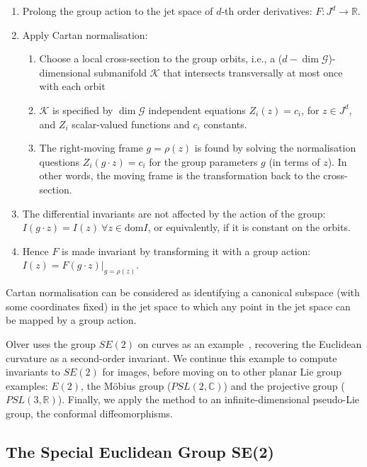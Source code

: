 \documentclass[review,onefignum,onetabnum]{siamonline190516}
\begin{document}
\begin{enumerate}
\item Prolong the group action to the jet space of $d$-th order derivatives: $F: J^d \to \mathbb{R}$. 
\item Apply Cartan normalisation:
    \begin{enumerate}
    \item Choose a local cross-section to the group orbits, i.e., a ($d - \dim \mathcal{G}$)-dimensional submanifold $\mathcal{K}$ that intersects transversally at most once with each orbit
    \item $\mathcal{K}$ is specified by $\dim \mathcal{G}$ independent equations $Z_i (z) = c_i$, for $z \in J^d$,  and $Z_i$ scalar-valued functions and $c_i$ constants.
    \item The right-moving frame $g = \rho(z)$ is found by solving the normalisation questions $Z_i (g \cdot z) = c_i$ for the group parameters $g$ (in terms of $z$). In other words, the moving frame is the transformation back to the cross-section.
    \end{enumerate}
\item The differential invariants are not affected by the action of the group: $I(g \cdot z) = I(z) \: \forall z \in \mathrm{dom} I$, or equivalently, if it is constant on the orbits. 
\item Hence $F$ is made invariant by transforming it with a group action: $I(z) = F(g \cdot z) |_{g=\rho(z)}$.  
\end{enumerate}

Cartan normalisation can be considered as identifying a canonical subspace (with some coordinates fixed) in the jet space to which any point in the jet space can be mapped by a group action.

Olver uses the group $SE(2)$ on curves as an example~\cite{OlverCIT}, recovering the Euclidean curvature as a second-order invariant. We continue this example to compute invariants to $SE(2)$ for images, before moving on to other planar Lie group examples: $E(2)$, the M\"obius group ($PSL(2,\mathbb{C})$) and the projective group ($PSL(3,\mathbb{R})$). Finally, we apply the method to an infinite-dimensional pseudo-Lie group, the conformal diffeomorphisms.

\subsection{The Special Euclidean Group SE(2)}
\label{sec:SE2}
\end{document}
